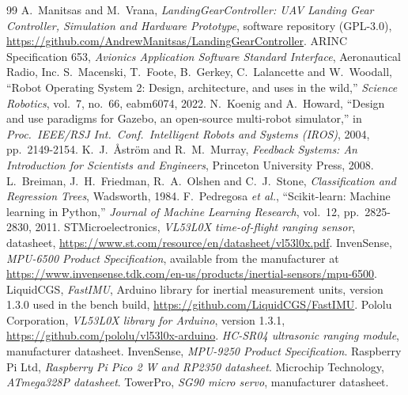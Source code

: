 \documentclass[11pt,a4paper]{article}
\begin{document}
\begin{thebibliography}{99}
 A.~Manitsas and M.~Vrana, \emph{LandingGearController: UAV Landing Gear Controller, Simulation and Hardware Prototype}, software repository (GPL-3.0), \url{https://github.com/AndrewManitsas/LandingGearController}.
 ARINC Specification 653, \emph{Avionics Application Software Standard Interface}, Aeronautical Radio, Inc.
 S.~Macenski, T.~Foote, B.~Gerkey, C.~Lalancette and W.~Woodall, ``Robot Operating System 2: Design, architecture, and uses in the wild,'' \emph{Science Robotics}, vol.~7, no.~66, eabm6074, 2022.
 N.~Koenig and A.~Howard, ``Design and use paradigms for Gazebo, an open-source multi-robot simulator,'' in \emph{Proc.\ IEEE/RSJ Int.\ Conf.\ Intelligent Robots and Systems (IROS)}, 2004, pp.~2149-2154.
 K.~J.~{\AA}str{\"o}m and R.~M.~Murray, \emph{Feedback Systems: An Introduction for Scientists and Engineers}, Princeton University Press, 2008.
 L.~Breiman, J.~H.~Friedman, R.~A.~Olshen and C.~J.~Stone, \emph{Classification and Regression Trees}, Wadsworth, 1984.
 F.~Pedregosa \emph{et al.}, ``Scikit-learn: Machine learning in Python,'' \emph{Journal of Machine Learning Research}, vol.~12, pp.~2825-2830, 2011.
 STMicroelectronics, \emph{VL53L0X time-of-flight ranging sensor}, datasheet, \url{https://www.st.com/resource/en/datasheet/vl53l0x.pdf}.
 InvenSense, \emph{MPU-6500 Product Specification}, available from the manufacturer at \url{https://www.invensense.tdk.com/en-us/products/inertial-sensors/mpu-6500}.
 LiquidCGS, \emph{FastIMU}, Arduino library for inertial measurement units, version 1.3.0 used in the bench build, \url{https://github.com/LiquidCGS/FastIMU}.
 Pololu Corporation, \emph{VL53L0X library for Arduino}, version 1.3.1, \url{https://github.com/pololu/vl53l0x-arduino}.
 \emph{HC-SR04 ultrasonic ranging module}, manufacturer datasheet.
 InvenSense, \emph{MPU-9250 Product Specification}.
 Raspberry Pi Ltd, \emph{Raspberry Pi Pico 2 W and RP2350 datasheet}.
 Microchip Technology, \emph{ATmega328P datasheet}.
 TowerPro, \emph{SG90 micro servo}, manufacturer datasheet.
\end{thebibliography}
 
\end{document}
